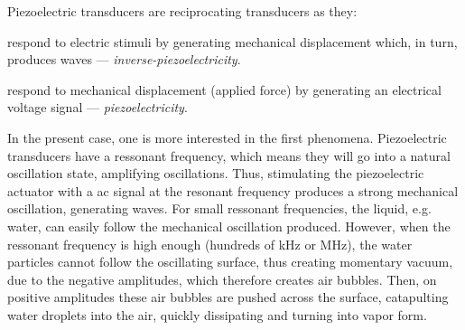 Piezoelectric transducers are reciprocating transducers as they:
\begin{item-c}
\item respond to electric stimuli by generating mechanical displacement which,
  in turn, produces waves --- \emph{inverse-piezoelectricity}.
\item respond to mechanical displacement (applied force) by generating an
  electrical voltage signal --- \emph{piezoelectricity}.
\end{item-c}

In the present case, one is more interested in the first
phenomena. Piezoelectric transducers have a ressonant frequency, which means
they will go into a natural oscillation state, amplifying oscillations. Thus,
stimulating the piezoelectric actuator with a \gls{ac} signal at the resonant
frequency produces a strong mechanical oscillation, generating waves.
For small ressonant frequencies, the liquid, e.g. water, can easily follow the
mechanical oscillation produced.
However, when the ressonant frequency is high enough (hundreds of kHz or MHz),
the water particles cannot follow the oscillating surface, thus creating
momentary vacuum, due to the negative amplitudes, which therefore creates air
bubbles.
Then, on positive amplitudes these air bubbles are pushed across the surface,
catapulting water droplets into the air, quickly dissipating and turning into
vapor form.


